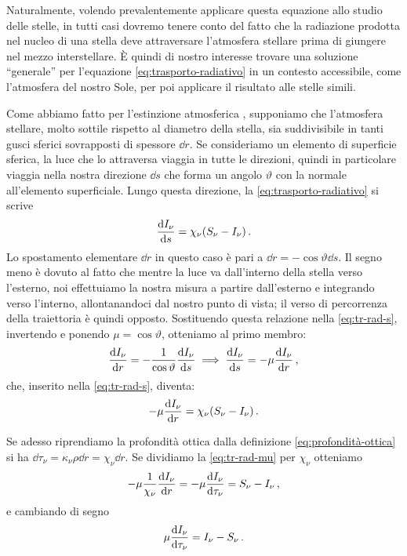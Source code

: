     Naturalmente, volendo prevalentemente applicare questa equazione allo studio delle stelle, in tutti casi dovremo tenere conto del fatto che la radiazione prodotta nel nucleo di una stella deve attraversare l'atmosfera stellare prima di giungere nel mezzo interstellare. È quindi di nostro interesse trovare una soluzione ``generale'' per l'equazione \eqref{eq:trasporto-radiativo} in un contesto accessibile, come l'atmosfera del nostro Sole, per poi applicare il risultato alle stelle simili.

    Come abbiamo fatto per l'estinzione atmosferica , supponiamo che l'atmosfera stellare, molto sottile rispetto al diametro della stella, sia suddivisibile in tanti gusci sferici sovrapposti di spessore $\dd{r}$. Se consideriamo un elemento di superficie sferica, la luce che lo attraversa viaggia in tutte le direzioni, quindi in particolare viaggia nella nostra direzione $\dd{s}$ che forma un angolo $\vartheta$ con la normale all'elemento superficiale.
    Lungo questa direzione, la \eqref{eq:trasporto-radiativo} si scrive
    \begin{equation}
        \label{eq:tr-rad-s}
        \dv{I_\nu}{s} = \chi_{\nu}\pqty{S_{\nu} - I_{\nu}}
        \myperiod
    \end{equation}
    Lo spostamento elementare $\dd{r}$ in questo caso è pari a $\dd{r} = - \cos\vartheta\dd{s}$. Il segno meno è dovuto al fatto che mentre la luce va dall'interno della stella verso l'esterno, noi effettuiamo la nostra misura a partire dall'esterno e integrando verso l'interno, allontanandoci dal nostro punto di vista; il verso di percorrenza della traiettoria è quindi opposto. Sostituendo questa relazione nella \eqref{eq:tr-rad-s}, invertendo e ponendo $\mu = \cos\vartheta$, otteniamo al primo membro:
    \begin{equation*} 
        \dv{I_\nu}{r}
        = -\frac{1}{\cos\vartheta} \dv{I_\nu}{s}
        \implies \dv{I_\nu}{s}
        = -\mu\dv{I_\nu}{r}
        \,,
    \end{equation*}
    che, inserito nella \eqref{eq:tr-rad-s}, diventa:
    \begin{equation}
        \label{eq:tr-rad-mu}
        -\mu\dv{I_\nu}{r} = \chi_{\nu}\pqty{S_{\nu} - I_{\nu}}
        \myperiod
    \end{equation}

    Se adesso riprendiamo la profondità ottica dalla definizione \eqref{eq:profondità-ottica} si ha $\dd{\tau_\nu} = \kappa_\nu \rho \dd{r} = \chi_\nu\dd{r}$. Se dividiamo la \eqref{eq:tr-rad-mu} per $\chi_\nu$ otteniamo
    \begin{equation*}
        -\mu\frac{1}{\chi_\nu} \dv{I_\nu}{r}
        = -\mu \dv{I_\nu}{\tau_\nu}
        = S_{\nu} - I_{\nu}
        \,,
    \end{equation*}
    e cambiando di segno
    \begin{equation}
        \label{eq:tr-rad-tau}
        \mu \dv{I_\nu}{\tau_\nu}
        = I_{\nu} - S_{\nu} 
        \,.
    \end{equation}

